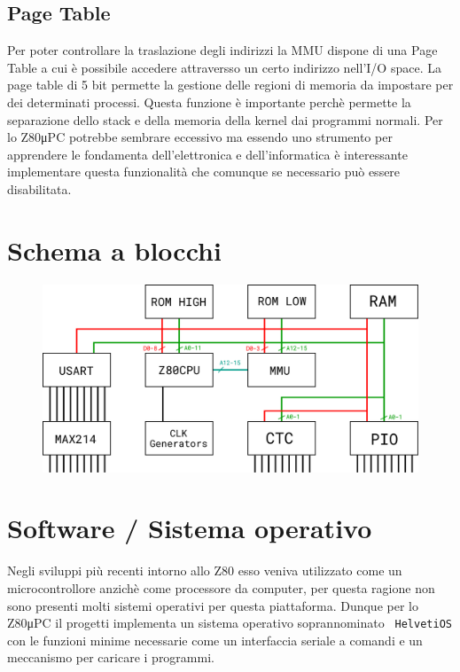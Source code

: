 \documentclass[a4paper, 11pt, twoside]{article}
\newcommand{\prj}{Z80μPC\xspace}
\begin{document}
\subsection{Page Table}

Per poter controllare la traslazione degli indirizzi la MMU dispone di una
Page Table a cui \`e possibile accedere attraversso un certo indirizzo
nell'I/O space. La page table di 5 bit permette la gestione delle regioni di
memoria da impostare per dei determinati processi. Questa funzione \`e 
importante perch\`e permette la separazione dello stack e della memoria della
kernel dai programmi normali. Per lo \prj potrebbe sembrare eccessivo ma
essendo uno strumento per apprendere le fondamenta dell'elettronica e
dell'informatica \`e interessante implementare questa funzionalit\`a che
comunque se necessario pu\`o essere disabilitata.

\section{Schema a blocchi}

\begin{figure}[!h] \centering
    \includegraphics[width=.85\linewidth]{res/block_diagram}
\end{figure}

\section{Software / Sistema operativo}

Negli sviluppi pi\`u recenti intorno allo Z80 esso veniva utilizzato come un
microcontrollore anzich\`e come processore da computer, per questa ragione non
sono presenti molti sistemi operativi per questa piattaforma. Dunque per lo
\prj il progetti implementa un sistema operativo soprannominato {\tt
HelvetiOS} con le funzioni minime necessarie come un interfaccia seriale a
comandi e un meccanismo per caricare i programmi.
\end{document}
